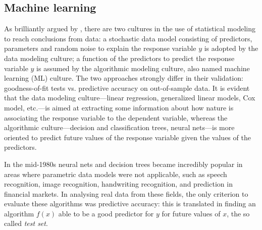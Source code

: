 \documentclass{statsoc}
\begin{document}
%

\color{black}


\subsection{Machine learning}

As brilliantly argued by \cite{breiman2001statistical}, there are two cultures in the use of statistical modeling to reach conclusions from data: a stochastic data model consisting 
of predictors, parameters and random noise to explain the response variable $y$ is adopted by the data modeling culture; a function of the predictors to predict the response variable 
$y$ is assumed by the algorithmic modeling culture, also named machine learning (ML) culture. The two approaches strongly differ in their validation: goodness-of-fit tests vs. 
predictive accuracy on out-of-sample data.  It is evident that the data modeling culture---linear regression, generalized linear models, Cox model, etc.---is aimed at extracting some information about how nature is associating the response variable to the dependent variable, whereas the algorithmic culture---decision and classification trees, neural nets---is more oriented to predict future values of the response variable given the values of the predictors.

In the mid-1980s neural nets and decision trees became incredibly popular \citep{breiman1984classification} in areas where parametric data models were not applicable, such as 
speech recognition, image recognition, handwriting recognition, and prediction in financial markets. In analysing real data from these fields, the only criterion to evaluate these 
algorithms was predictive accuracy: this is translated in finding an algorithm $f(x)$ able to be a good predictor for $y$ for future values of $x$, the so called \emph{test set}. 

\end{document}

